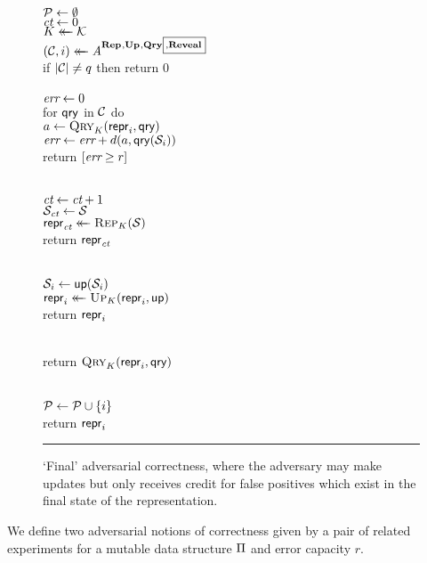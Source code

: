 \begin{figure}[t]
  {
     \\[2pt]
      $\mathcal{P} \gets \emptyset$\\
      $\textit{ct} \gets 0$ \\
      $K \mathrel{\leftarrow\mkern-14mu\leftarrow} \mathcal{K}$\\
      $(\mathcal{C},i) \mathrel{\leftarrow\mkern-14mu\leftarrow} \mathit{A}^{\mathbf{Rep}\hspace{0.5pt},\mathbf{Up}\hspace{0.5pt},\mathbf{Qry}\hspace{0.5pt}{\scriptsize\boxed{\!,\!\mathbf{Reveal}}}}$\\
      if $|\mathcal{C}| \neq q$ then return 0\\
       \\
      $\textit{err} \gets 0$\\
      for $\mathsf{qry}$ in $\mathcal{C}$ do\\
      \tab $a \gets \textsc{Qry}_K(\mathsf{repr}_i, \mathsf{qry})$\\
      \tab $\textit{err} \gets \textit{err} + d(a,\mathsf{qry}(\mathcal{S}_i))$\\
      return $[\textit{err} \geq r]$ }
  {

    \oraclev{$\REPO(\col)$}\\[2pt]
      $\textit{ct}\gets\textit{ct}+1$ \\
      $\mathcal{S}_{\textit{ct}} \gets \mathcal{S}$\\
      $\mathsf{repr}_{\textit{ct}} \mathrel{\leftarrow\mkern-14mu\leftarrow} \textsc{Rep}_K(\mathcal{S})$\\
      return $\mathsf{repr}_{\textit{ct}}$   
      \medskip

    \\[2pt]
      $\mathcal{S}_i \gets \mathsf{up}(\mathcal{S}_i)$\\
      $\mathsf{repr}_i \mathrel{\leftarrow\mkern-14mu\leftarrow} \textsc{Up}_K(\mathsf{repr}_i, \mathsf{up})$\\
      return $\mathsf{repr}_i$ 
      \medskip

    \\[2pt]
      return $\textsc{Qry}_K(\mathsf{repr}_i, \mathsf{qry})$
      \medskip

    \\[2pt]
     $\mathcal{P} \gets \mathcal{P} \cup \{i\}$ \\
      return $\mathsf{repr}_i$
  }
  \caption{`Final' adversarial correctness, where the adversary may make updates but only receives credit for false positives which exist in the final state of the representation.}
  \vspace{6pt}\hrule
  \label{fig:security}
\end{figure}

We define two adversarial notions of correctness given by a pair of related experiments for a mutable data structure $\mathrm{\Pi}$ and error capacity $r$.

